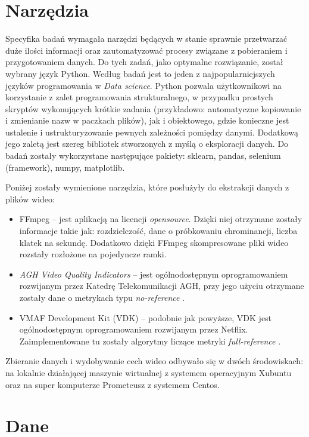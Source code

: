 \section{Narzędzia}
Specyfika badań wymagała narzędzi będących w stanie sprawnie przetwarzać duże ilości informacji oraz zautomatyzować procesy związane z pobieraniem i przygotowaniem danych. Do tych zadań, jako optymalne rozwiązanie, został wybrany język Python. Według badań \cite{python} jest to jeden z najpopularniejszych języków programowania w {\em Data science}. Python pozwala użytkownikowi na korzystanie z zalet programowania strukturalnego, w przypadku prostych skryptów wykonujących krótkie zadania (przykładowo: automatyczne kopiowanie i zmienianie nazw w paczkach plików), jak i obiektowego, gdzie konieczne jest ustalenie i ustrukturyzowanie pewnych zależności pomiędzy danymi. Dodatkową jego zaletą jest szereg bibliotek stworzonych z myślą o eksploracji danych. Do badań zostały wykorzystane następujące pakiety: sklearn, pandas, selenium (framework), numpy, matplotlib.\par\par
Poniżej zostały wymienione narzędzia, które posłużyły do ekstrakcji danych z plików wideo:
\begin{itemize}[label=$\bullet$]
\item FFmpeg -- jest aplikacją na licencji {\em opensource}. Dzięki niej otrzymane zostały informacje takie jak: rozdzielczość, dane o próbkowaniu chrominancji, liczba klatek na sekundę. Dodatkowo dzięki FFmpeg skompresowane pliki wideo rozstały rozłożone na pojedyncze ramki.
\item {\em AGH Video Quality Indicators} -- jest ogólnodostępnym oprogramowaniem rozwijanym przez Katedrę Telekomunikacji AGH, przy jego użyciu otrzymane zostały dane o metrykach typu {\em no-reference} \cite{agh_vqm}.
\item VMAF Development Kit (VDK) -- podobnie jak powyższe, VDK jest ogólnodostępnym oprogramowaniem rozwijanym przez Netflix. Zaimplementowane tu zostały algorytmy liczące metryki {\em full-reference} \cite{vdk}.
\end{itemize}
Zbieranie danych i wydobywanie cech wideo odbywało się w dwóch środowiskach: na lokalnie działającej maszynie wirtualnej z systemem operacyjnym Xubuntu oraz na super komputerze Prometeusz z systemem Centos. 

\label{cha:drugiDokument}



\section{Dane}
\label{cha:drugiDokument}

